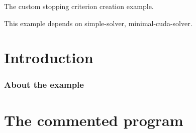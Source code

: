 The custom stopping criterion creation example.

This example depends on simple-\/solver, minimal-\/cuda-\/solver.

 \label{_Intro}%
 \label{_Introduction}%
\section*{Introduction}

\label{_Abouttheexample}%
\subsubsection*{About the example }

\label{_CommProg}%
 \section*{The commented program}


